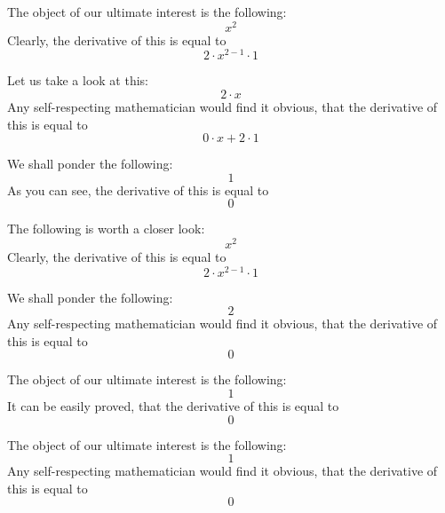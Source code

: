 \documentclass{article}
\begin{document}
The object of our ultimate interest is the following:
\begin{equation}
x ^{2 } 
\end{equation}
Clearly, the derivative of this is equal to
\begin{equation}
2 \cdot x ^{2 - 1 } \cdot 1 
\end{equation}

Let us take a look at this:
\begin{equation}
2 \cdot x 
\end{equation}
Any self-respecting mathematician would find it obvious, that the derivative of this is equal to
\begin{equation}
0 \cdot x + 2 \cdot 1 
\end{equation}

We shall ponder the following:
\begin{equation}
1 
\end{equation}
As you can see, the derivative of this is equal to
\begin{equation}
0 
\end{equation}

The following is worth a closer look:
\begin{equation}
x ^{2 } 
\end{equation}
Clearly, the derivative of this is equal to
\begin{equation}
2 \cdot x ^{2 - 1 } \cdot 1 
\end{equation}

We shall ponder the following:
\begin{equation}
2 
\end{equation}
Any self-respecting mathematician would find it obvious, that the derivative of this is equal to
\begin{equation}
0 
\end{equation}

The object of our ultimate interest is the following:
\begin{equation}
1 
\end{equation}
It can be easily proved, that the derivative of this is equal to
\begin{equation}
0 
\end{equation}

The object of our ultimate interest is the following:
\begin{equation}
1 
\end{equation}
Any self-respecting mathematician would find it obvious, that the derivative of this is equal to
\begin{equation}
0 
\end{equation}
\end{document}
